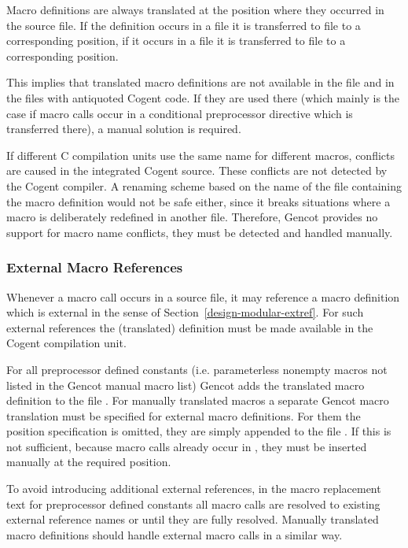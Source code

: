 Macro definitions are always translated at the position where they occurred in the source file.
If the definition occurs in a file  it is transferred to file  to a corresponding position,
if it occurs in a file  it is transferred to file  to a corresponding position.

This implies that translated macro definitions are not available in the file  and in the files with
antiquoted Cogent code. If they are used there (which mainly is the case if macro calls occur in a conditional
preprocessor directive which is transferred there), a manual solution is required.

If different C compilation units use the same name for different macros, conflicts are caused in the integrated Cogent
source. These conflicts are not detected by the Cogent compiler. A renaming scheme based on the name of the file 
containing the macro definition would not be safe either, since it breaks situations where a macro is deliberately
redefined in another file. Therefore, Gencot provides no support for macro name conflicts, they must be detected and
handled manually.

\subsubsection{External Macro References}

Whenever a macro call occurs in a source file, it may reference a macro definition which is external in 
the sense of Section~\ref{design-modular-extref}. For such external references the (translated) definition 
must be made available in the Cogent compilation unit.

For all preprocessor defined constants (i.e. parameterless nonempty macros not listed in the Gencot manual 
macro list) Gencot adds the translated macro definition to the file . For
manually translated macros a separate Gencot macro translation must be specified for external macro definitions.
For them the position specification is omitted, they are simply appended to the file 
. If this is not sufficient, because macro calls already occur in 
, they must be inserted manually at the required position.

To avoid introducing additional external references, in the macro replacement text for preprocessor defined 
constants all macro calls are resolved to existing external reference names or until they are fully resolved.
Manually translated macro definitions should handle external macro calls in a similar way.

